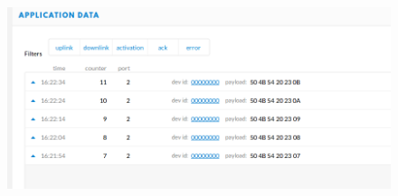 \documentclass{article}
\begin{document}
\begin{itemize}
  \begin{figure}[H]
\begin{center}
\advance\leftskip-3cm
\advance\rightskip-3cm
\includegraphics[keepaspectratio=true,scale=0.4]{payload.png}
\label{visina8}
\end{center}\end{figure}
  
  
\end{itemize}
\end{document}
